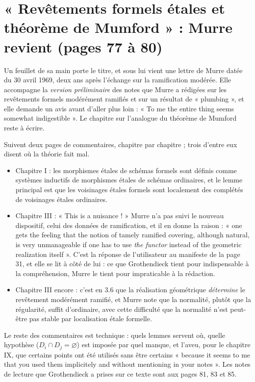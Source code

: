 \documentclass[11pt,a4paper]{article}
\begin{document}
\section*{« Revêtements formels étales et théorème de Mumford » : Murre revient (pages 77 à 80)}

Un feuillet de sa main porte le titre, et sous lui vient une lettre de Murre
datée du 30 avril 1969, deux ans après l'échange sur la ramification
modérée. Elle accompagne la \emph{version préliminaire} des notes que Murre a
rédigées sur les revêtements formels modérément ramifiés et sur un résultat de
« plumbing », et elle demande un avis avant d'aller plus loin : « To me the
entire thing seems somewhat indigestible ». Le chapitre sur l'analogue du
théorème de Mumford reste à écrire.

Suivent deux pages de commentaires, chapitre par chapitre ; trois d'entre eux
disent où la théorie fait mal.

\begin{itemize}
  \item Chapitre I : les morphismes étales de schémas formels sont définis
    comme systèmes inductifs de morphismes étales de schémas ordinaires, et le
    lemme principal est que les voisinages étales formels sont localement des
    complétés de voisinages étales ordinaires.
  \item Chapitre III : « This is a nuisance ! » Murre n'a pas suivi le nouveau
    dispositif, celui des données de ramification, et il en donne la
    raison : « one gets the feeling that the notion of tamely ramified covering,
    although natural, is very unmanageable if one has to use \emph{the functor}
    instead of the geometric realization itself ». C'est la réponse de
    l'utilisateur au manifeste de la page 31, et elle se lit à côté
    de lui : ce que Grothendieck tient pour indispensable à la compréhension,
    Murre le tient pour impraticable à la rédaction.
  \item Chapitre III encore : c'est en 3.6 que la réalisation géométrique
    \emph{détermine} le revêtement modérément ramifié, et Murre note que la
    normalité, plutôt que la régularité, suffit d'ordinaire, avec cette
    difficulté que la normalité n'est peut-être pas stable par localisation
    étale formelle.
\end{itemize}

Le reste des commentaires est technique : quels lemmes servent où, quelle
hypothèse ($D_{i} \cap D_{j} = \varnothing$) est imposée par quel manque, et
l'aveu, pour le chapitre IX, que certains points ont été utilisés sans être
certains « because it seems to me that you used them implicitely and without
mentioning in your notes ». Les notes de lecture que Grothendieck a prises sur
ce texte sont aux pages 81, 83 et 85.
\end{document}
